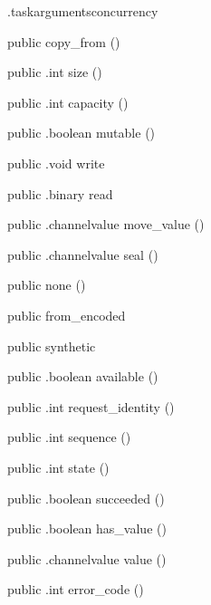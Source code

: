\begin{CrexxClass}{.taskarguments}{concurrency}
\begin{Members}
    \Factory
      {public}
      {copy\_from}
      {()}

    \Method
      {public}
      {.int}
      {size}
      {()}

    \Method
      {public}
      {.int}
      {capacity}
      {()}

    \Method
      {public}
      {.boolean}
      {mutable}
      {()}

    \Method
      {public}
      {.void}
      {write}
      {}

    \Method
      {public}
      {.binary}
      {read}
      {}

    \Method
      {public}
      {.channelvalue}
      {move\_value}
      {()}

    \Method
      {public}
      {.channelvalue}
      {seal}
      {()}

    \Factory
      {public}
      {none}
      {()}

    \Factory
      {public}
      {from\_encoded}
      {}

    \Factory
      {public}
      {synthetic}
      {}

    \Method
      {public}
      {.boolean}
      {available}
      {()}

    \Method
      {public}
      {.int}
      {request\_identity}
      {()}

    \Method
      {public}
      {.int}
      {sequence}
      {()}

    \Method
      {public}
      {.int}
      {state}
      {()}

    \Method
      {public}
      {.boolean}
      {succeeded}
      {()}

    \Method
      {public}
      {.boolean}
      {has\_value}
      {()}

    \Method
      {public}
      {.channelvalue}
      {value}
      {()}

    \Method
      {public}
      {.int}
      {error\_code}
      {()}


\end{Members}
\end{CrexxClass}
